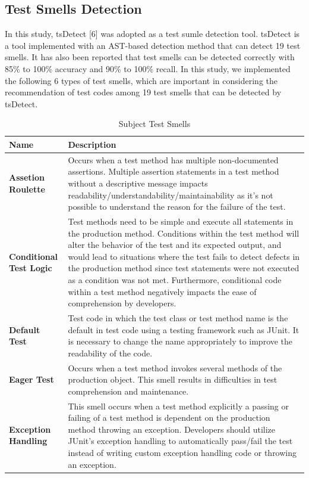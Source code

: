 \documentclass[conference]{IEEEtran}
\begin{document}
\subsection{Test Smells Detection}
In this study, tsDetect [6] was adopted as a test sumle detection tool. tsDetect is a tool implemented with an AST-based detection method that can detect 19 test smells. It has also been reported that test smells can be detected correctly with 85\% to 100\% accuracy and 90\% to 100\% recall. In this study, we implemented the following 6 types of test smells, which are important in considering the recommendation of test codes among 19 test smells that can be detected by tsDetect.
\begin{table}[hbtp]
\caption{Subject Test Smells}
\begin{tabular}{|l|p{5.2cm}|}
\hline
\textbf{Name}                   & \textbf{Description}                                                                                                       \\ \hline
\textbf{Assetion Roulette}        & Occurs when a test method has multiple non-documented assertions. Multiple assertion statements in a test method without a descriptive message impacts readability/understandability/maintainability as it’s not possible to understand the reason for the failure of the test.  \\ \hline
\textbf{Conditional Test Logic} & Test methods need to be simple and execute all statements in the production method. Conditions within the test method will alter the behavior of the test and its expected output, and would lead to situations where the test fails to detect defects in the production method since test statements were not executed as a condition was not met. Furthermore, conditional code within a test method negatively impacts the ease of comprehension by developers. \\ \hline
\textbf{Default Test}            & Test code in which the test class or test method name is the default in test code using a testing framework such as JUnit. It is necessary to change the name appropriately to improve the readability of the code.                                                                                                      \\ \hline
\textbf{Eager Test }             & Occurs when a test method invokes several methods of the production object. This smell results in difficulties in test comprehension and maintenance. \\ \hline
\textbf{Exception Handling}      & This smell occurs when a test method explicitly a passing or failing of a test method is dependent on the production method throwing an exception. Developers should utilize JUnit's exception handling to automatically pass/fail the test instead of writing custom exception handling code or throwing an exception. \\ \hline

\end{tabular}
\end{table}
\end{document}
